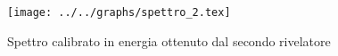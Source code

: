 \begin{figure}[h] \centering\texttt{[image: ../../graphs/spettro\_2.tex]}\caption{Spettro calibrato in energia ottenuto dal secondo rivelatore }\label{gr:spettro_2} \end{figure}
